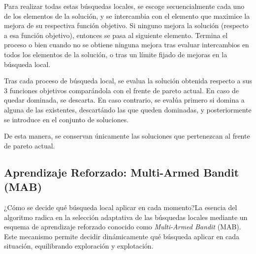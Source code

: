 \documentclass[12pt,a4paper]{book}
\begin{document}
Para realizar todas estas búsquedas locales, se escoge secuencialmente cada uno de los elementos de la solución, y se intercambia con el elemento que maximice la mejora de su respectiva función objetivo. Si ninguno mejora la solución (respecto a esa función objetivo), entonces se pasa al siguiente elemento. 
Termina el proceso o bien cuando no se obtiene ninguna mejora tras evaluar intercambios en todos los elementos de la solución, o tras un límite fijado de mejoras en la búsqueda local.

Tras cada proceso de búsqueda local, se evalua la solución obtenida respecto a sus 3 funciones objetivos comparándola con el frente de pareto actual. En caso de quedar dominada, se descarta. En caso contrario, se evalúa primero si domina a alguna de las existentes, descartándo las que queden dominadas,
y posteriormente se introduce en el conjunto de soluciones.

De esta manera, se conservan únicamente las soluciones que pertenezcan al frente de pareto actual.

\subsection{Aprendizaje Reforzado: Multi-Armed Bandit (MAB)}
¿Cómo se decide qué búsqueda local aplicar en cada momento?La esencia del algoritmo radica en la selección adaptativa de las búsquedas locales mediante un esquema de aprendizaje reforzado conocido como \textit{Multi-Armed Bandit} (MAB).
Este mecanismo permite decidir dinámicamente qué búsqueda aplicar en cada situación, equilibrando exploración y explotación.  
\end{document}
